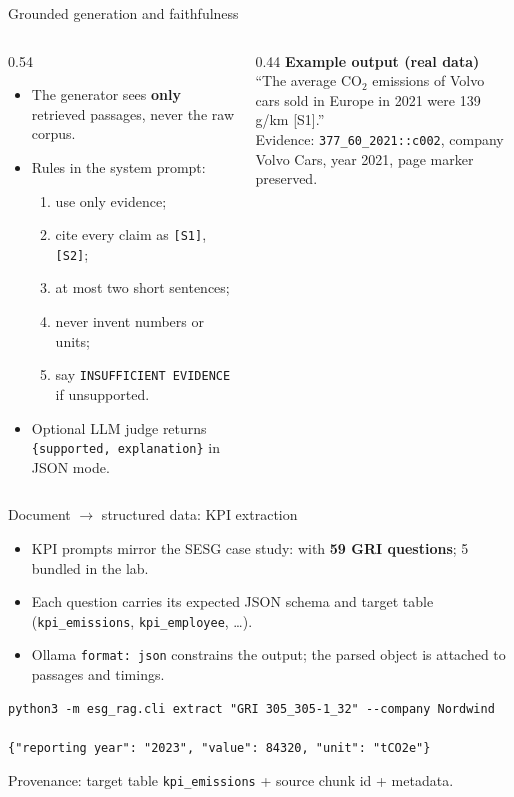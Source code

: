 \documentclass[aspectratio=169]{beamer}
\begin{document}
\begin{frame}{Grounded generation and faithfulness}
  \begin{columns}[T]
    \begin{column}{0.54\textwidth}
      \begin{itemize}
        \item The generator sees \textbf{only} retrieved passages, never the raw corpus.
        \item Rules in the system prompt:
          \begin{enumerate}
            \item use only evidence;
            \item cite every claim as \texttt{[S1]}, \texttt{[S2]};
            \item at most two short sentences;
            \item never invent numbers or units;
            \item say \texttt{INSUFFICIENT EVIDENCE} if unsupported.
          \end{enumerate}
        \item Optional LLM judge returns \texttt{\{supported, explanation\}} in JSON mode.
      \end{itemize}
    \end{column}
    \begin{column}{0.44\textwidth}
      \scriptsize
      \textbf{Example output (real data)}\\[1mm]
      ``The average CO$_2$ emissions of Volvo cars sold in Europe in 2021 were 139 g/km [S1].''\\[2mm]
      Evidence: \texttt{377\_60\_2021::c002}, company Volvo Cars, year 2021, page marker preserved.
    \end{column}
  \end{columns}
\end{frame}

\begin{frame}[fragile]{Document $\to$ structured data: KPI extraction}
  \begin{itemize}
    \item KPI prompts mirror the SESG case study:  with \textbf{59 GRI questions}; 5 bundled in the lab.
    \item Each question carries its expected JSON schema and target table (\texttt{kpi\_emissions}, \texttt{kpi\_employee}, \ldots).
    \item Ollama \texttt{format: json} constrains the output; the parsed object is attached to passages and timings.
  \end{itemize}
  \vspace{1mm}
  \begin{lstlisting}
python3 -m esg_rag.cli extract "GRI 305_305-1_32" --company Nordwind

{"reporting year": "2023", "value": 84320, "unit": "tCO2e"}
  \end{lstlisting}
  \small Provenance: target table \texttt{kpi\_emissions} + source chunk id + metadata.
\end{frame}
\end{document}
